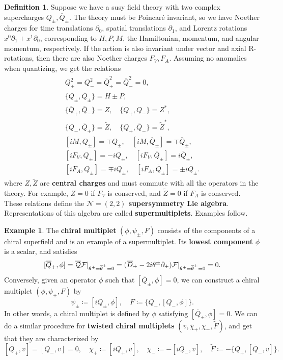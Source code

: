 \documentclass{report}
\theoremstyle{plain}
\theoremstyle{definition}
\newtheorem{definition}[theorem]{Definition}
\newtheorem{example}[theorem]{Example}
\theoremstyle{remark}
\newcommand{\di}{\partial}
\newcommand{\cN}{\mathcal{N}}
\newcommand{\cnj}{\overline}
\begin{document}
\begin{definition}
  Suppose we have a susy field theory with two complex supercharges
  $Q_\pm, \cnj Q_\pm$. The theory must be Poincar\'e invariant, so we
  have Noether charges for time translations $\di_0$, spatial
  translations $\di_1$, and Lorentz rotations $x^0\di_1 + x^1\di_0$,
  corresponding to $H, P, M$, the Hamiltonian, momentum, and angular
  momentum, respectively. If the action is also invariant under vector
  and axial R-rotations, then there are also Noether charges $F_V,
  F_A$. Assuming no anomalies when quantizing, we get the relations
  \begin{align}
  \begin{gathered} \label{eq:n22-susy-relations}
    Q_+^2 = Q_-^2 = \cnj Q_+^2 = \cnj Q_-^2 = 0, \\
    \{Q_\pm, \cnj Q_\pm\} = H \pm P, \\
    \{\cnj Q_+, \cnj Q_-\} = Z, \quad \{Q_+, Q_-\} = Z^*, \\
    \{Q_-, \cnj Q_+\} = \tilde Z, \quad \{Q_+, \cnj Q_-\} = \tilde Z^*, \\
    [iM, Q_\pm] = \mp Q_\pm, \quad [iM, \cnj Q_\pm] = \mp \cnj Q_\pm, \\
    [iF_V, Q_\pm] = -iQ_\pm, \quad [iF_V, \cnj Q_\pm] = i\cnj Q_\pm, \\
    [iF_A, Q_\pm] = \mp iQ_\pm, \quad [iF_A, \cnj Q_\pm] = \pm i\cnj Q_\pm.
  \end{gathered}
  \end{align}
  where $Z, \tilde Z$ are {\bf central charges} and must commute with
  all the operators in the theory. For example, $Z = 0$ if $F_V$ is
  conserved, and $\tilde Z = 0$ if $F_A$ is conserved. These relations
  define the {\bf $\cN = (2,2)$ supersymmetry Lie algebra}.
  Representations of this algebra are called {\bf supermultiplets}.
  Examples follow.
\end{definition}

\begin{example} \label{ex:chiral-multiplet}
  The {\bf chiral multiplet} $(\phi, \psi_\pm, F)$ consists of the
  components of a chiral superfield and is an example of a
  supermultiplet. Its {\bf lowest component} $\phi$ is a scalar, and
  satisfies
  \[ [\cnj Q_\pm, \phi] = \cnj{\cal Q} {\cal F}|_{\theta^\pm=\cnj\theta^\pm=0} = (\cnj D_\pm - 2i\theta^\pm \di_\pm) {\cal F}|_{\theta^\pm=\cnj\theta^\pm=0} = 0. \]
  Conversely, given an operator $\phi$ such that $[\cnj Q_\pm, \phi] =
  0$, we can construct a chiral multiplet $(\phi, \psi_\pm, F)$ by
  \[ \psi_\pm \coloneqq [iQ_\pm, \phi], \quad F \coloneqq \{Q_+, [Q_-, \phi]\}. \]
  In other words, a chiral multiplet is defined by $\phi$ satisfying
  $[\cnj Q_\pm, \phi] = 0$. We can do a similar procedure for {\bf
    twisted chiral multiplets} $(v, \cnj\chi_+, \chi_-, \tilde F)$,
  and get that they are characterized by
  \[ [\cnj Q_+, v] = [Q_-, v] = 0, \quad \cnj \chi_+ \coloneqq [iQ_+, v], \quad \chi_- \coloneqq -[i\cnj Q_-, v], \quad \tilde F \coloneqq -\{Q_+, [\cnj Q_-, v]\}. \]
\end{example}
\end{document}
